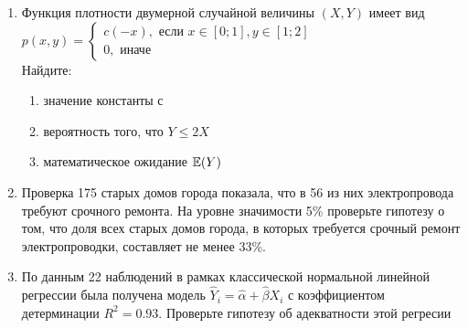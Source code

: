 \documentclass[pdftex,12pt,a4paper]{article}
\begin{document}
\begin{enumerate}
\item Функция плотности двумерной случайной величины $(X,Y)$ имеет вид\\
$p(x,y)=\begin{cases}
c(-x),\text{ если } x\in [0;1],y \in [1;2]\\
0,\text{ иначе }
\end{cases}$\\
Найдите:
\begin{enumerate}
\item значение константы с
\item вероятность того, что $Y\leq2X$
\item математическое ожидание $\mathbb{E}(Y)$
\end{enumerate}
\item Проверка 175 старых домов города показала, что в 56 из них электропровода требуют срочного ремонта. На уровне значимости 5\% проверьте гипотезу о том, что доля всех старых домов города, в которых требуется срочный ремонт электропроводки, составляет не менее 33\%.\\
\item По данным 22 наблюдений в рамках классической нормальной линейной регрессии была получена модель $\hat{Y}_i=\hat{\alpha}+\hat{\beta}X_i$ с коэффициентом детерминации $R^2=0.93$. Проверьте гипотезу об адекватности этой регресии
\end{enumerate}
\end{document}
